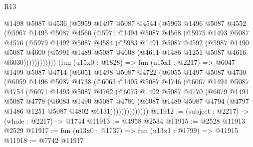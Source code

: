 \begin{lexlean}{R13}
\begin{coremodule}
            @1498
            @5087
            @4536
            (@5959
              @1497
              @5087
              @4544
              (@5963
                @1496
                @5087
                @4552
                (@5967
                  @1495
                  @5087
                  @4560
                  (@5971
                    @1494
                    @5087
                    @4568
                    (@5975
                      @1493
                      @5087
                      @4576
                      (@5979
                        @1492
                        @5087
                        @4584
                        (@5983
                          @1491
                          @5087
                          @4592
                          (@5987
                            @1490
                            @5087
                            @4600
                            (@5991
                              @1489
                              @5087
                              @4608
                              (@4611 @1486 @1251 @5087 @4616 @6030))))))))))))
        (fun (u15x0 : @1828) =>
        fun (u15x1 : @2217) =>
        @6047
          @1499
          @5087
          @4714
          (@6051
            @1498
            @5087
            @4722
            (@6055
              @1497
              @5087
              @4730
              (@6059
                @1496
                @5087
                @4738
                (@6063
                  @1495
                  @5087
                  @4746
                  (@6067
                    @1494
                    @5087
                    @4754
                    (@6071
                      @1493
                      @5087
                      @4762
                      (@6075
                        @1492
                        @5087
                        @4770
                        (@6079
                          @1491
                          @5087
                          @4778
                          (@6083
                            @1490
                            @5087
                            @4786
                            (@6087
                              @1489
                              @5087
                              @4794
                              (@4797 @1486 @1251 @5087 @4802 @6131))))))))))))))
@11912 := (subject : @2217) -> (whole : @2217) -> @1744
@11913 := @4958 @2534
@11915 := @2528 @11913 @2529
@11917 := fun (u13x0 : @1737) => fun (u13x1 : @1799) => @11915
@11918 := @7742 @11917

\end{coremodule}
\end{lexlean}
